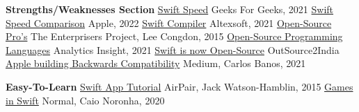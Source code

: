 \documentclass{article}
\theoremstyle{theorem}
\theoremstyle{definition}
\theoremstyle{remark}
\begin{document}
\begin{thebibliography}{99}
\textbf{Strengths/Weaknesses Section}\newline
\href{https://www.geeksforgeeks.org/difference-between-python-and-swift/}{Swift Speed} Geeks For Geeks, 2021 \newline
\href{https://www.apple.com/swift/}{Swift Speed Comparison} Apple, 2022\newline
\href{https://www.altexsoft.com/blog/engineering/the-good-and-the-bad-of-swift-programming-language/}{Swift Compiler} Altexsoft, 2021\newline
\href{https://enterprisersproject.com/article/2015/1/top-advantages-open-source-offers-over-proprietary-solutions}{Open-Source Pro's} The Enterprisers Project, Lee Congdon, 2015 \newline
\href{https://www.analyticsinsight.net/top-10-programming-languages-for-open-source-projects-in-2021/}{Open-Source Programming Languages} Analytics Insight, 2021 \newline
\href{https://www.outsource2india.com/software/mobile-applications/articles/apple-swift-now-open-source.asp}{Swift is now Open-Source} OutSource2India \newline
\href{https://medium.com/@carlos.banos85/swift-5-5-concurrency-backward-compatibility-884fd9c284da}{Apple building Backwards Compatibility} Medium, Carlos Banos, 2021 \newline

\textbf{Easy-To-Learn}\newline
\href{https://www.airpair.com/swift/building-swift-app-tutorial}{Swift App Tutorial} AirPair, Jack Watson-Hamblin, 2015 \newline
\href{https://caiocnoronha.medium.com/games-in-swift-88a72e441537}{Games in Swift} Normal, Caio Noronha, 2020\newline


\end{thebibliography}
\end{document}
